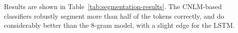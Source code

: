 



Results are shown in Table~\ref{tab:segmentation-results}. The
CNLM-based classifiers robustly segment more than half of the tokens
correctly, and do considerably better than the 8-gram model,
with a slight edge for the LSTM.%

